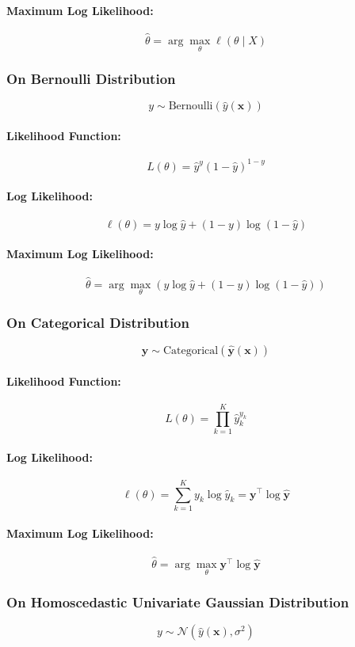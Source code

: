 \documentclass{article}
\begin{document}
\paragraph{Maximum Log Likelihood:}
\[
    \hat{\theta} = \arg\max_\theta \ell(\theta \mid X)
\]

\subsubsection{On Bernoulli Distribution}
\[
    y \sim \text{Bernoulli}(\hat{y}(\mathbf{x}))
\]
\paragraph{Likelihood Function:}
\[
    L(\theta) = \hat{y}^y (1-\hat{y})^{1-y}
\]
\paragraph{Log Likelihood:}
\[
    \ell(\theta) = y \log \hat{y} + (1-y) \log (1-\hat{y})
\]
\paragraph{Maximum Log Likelihood:}
\[
    \hat{\theta} = \arg\max_{\theta} \left( y \log \hat{y} + (1-y) \log (1-\hat{y}) \right)
\]

\subsubsection{On Categorical Distribution}
\[
    \mathbf{y} \sim \text{Categorical}(\hat{\mathbf{y}}(\mathbf{x}))
\]
\paragraph{Likelihood Function:}
\[
    L(\theta) = \prod_{k=1}^{K} \hat{y}_k^{y_k}
\]
\paragraph{Log Likelihood:}
\[
    \ell(\theta) = \sum_{k=1}^{K} y_k \log \hat{y}_k = \mathbf{y}^\top \log \hat{\mathbf{y}}
\]
\paragraph{Maximum Log Likelihood:}
\[
    \hat{\theta} = \arg\max_{\theta} \mathbf{y}^\top \log \hat{\mathbf{y}}
\]

\subsubsection{On Homoscedastic Univariate Gaussian Distribution}
\[
    y \sim \mathcal{N}(\hat{y}(\mathbf{x}), \sigma^2)
\]
\end{document}
